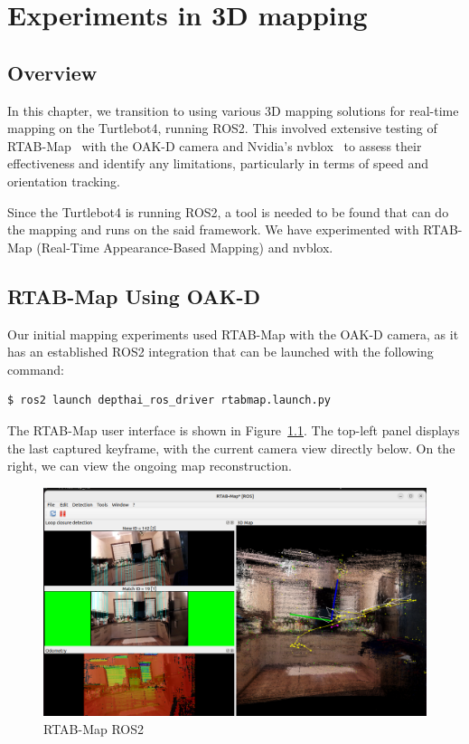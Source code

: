 \chapter{Experiments in 3D mapping} \label{experiments_3d_mapping}

\section{Overview}

In this chapter, we transition to using various 3D mapping solutions for real-time mapping on the Turtlebot4, running ROS2. This involved extensive testing of RTAB-Map~\cite{RTAB_Map_docs} with the OAK-D camera and Nvidia's nvblox~\cite{nvblox_docs} to assess their effectiveness and identify any limitations, particularly in terms of speed and orientation tracking.

Since the Turtlebot4 is running ROS2, a tool is needed to be found that can do the mapping and runs on the said framework. We have experimented with RTAB-Map (Real-Time Appearance-Based Mapping) and nvblox.


\section{RTAB-Map Using OAK-D} \label{experiments_rtab_map}

Our initial mapping experiments used RTAB-Map with the OAK-D camera, as it has an established ROS2 integration that can be launched with the following command:

\FloatBarrier
\begin{lstlisting}[language=bash,frame=single,float=!ht]
$ ros2 launch depthai_ros_driver rtabmap.launch.py
\end{lstlisting}

The RTAB-Map user interface is shown in Figure~\ref{fig:rtabmap_ros}. The top-left panel displays the last captured keyframe, with the current camera view directly below. On the right, we can view the ongoing map reconstruction.

\begin{figure}[htbp]
	\centering
	\includegraphics[width=150mm, keepaspectratio]{figures/rtabmap_ros.png}
	\caption{RTAB-Map ROS2}
	\label{fig:rtabmap_ros}
\end{figure}

